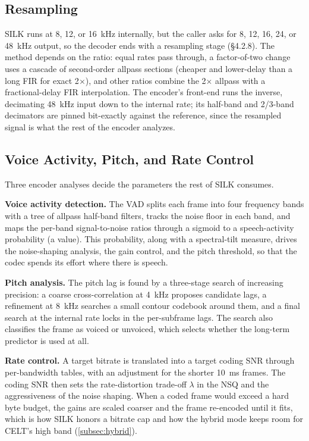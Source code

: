 \subsection{Resampling}\label{subsec:silk_resampler}

SILK runs at 8, 12, or 16~kHz internally, but the caller asks for 8, 12, 16, 24,
or 48~kHz output, so the decoder ends with a resampling stage (\S4.2.8). The
method depends on the ratio: equal rates pass through, a factor-of-two change
uses a cascade of second-order allpass sections (cheaper and lower-delay than a
long FIR for exact 2$\times$), and other ratios combine the 2$\times$ allpass with
a fractional-delay FIR interpolation. The encoder's front-end runs the inverse,
decimating 48~kHz input down to the internal rate; its half-band and 2/3-band
decimators are pinned bit-exactly against the reference, since the resampled
signal is what the rest of the encoder analyzes.

\subsection{Voice Activity, Pitch, and Rate Control}\label{subsec:silk_control}

Three encoder analyses decide the parameters the rest of SILK consumes.

\textbf{Voice activity detection.} The VAD splits each frame into four frequency
bands with a tree of allpass half-band filters, tracks the noise floor in each
band, and maps the per-band signal-to-noise ratios through a sigmoid to a
speech-activity probability (a  value). This probability, along with a
spectral-tilt measure, drives the noise-shaping analysis, the gain control, and
the pitch threshold, so that the codec spends its effort where there is speech.

\textbf{Pitch analysis.} The pitch lag is found by a three-stage search of
increasing precision: a coarse cross-correlation at 4~kHz proposes candidate
lags, a refinement at 8~kHz searches a small contour codebook around them, and a
final search at the internal rate locks in the per-subframe lags. The search also
classifies the frame as voiced or unvoiced, which selects whether the long-term
predictor is used at all.

\textbf{Rate control.} A target bitrate is translated into a target coding SNR
through per-bandwidth tables, with an adjustment for the shorter 10~ms frames.
The coding SNR then sets the rate-distortion trade-off $\lambda$ in the NSQ and
the aggressiveness of the noise shaping. When a coded frame would exceed a hard
byte budget, the gains are scaled coarser and the frame re-encoded until it fits,
which is how SILK honors a bitrate cap and how the hybrid mode keeps room for
CELT's high band (\cref{subsec:hybrid}).

